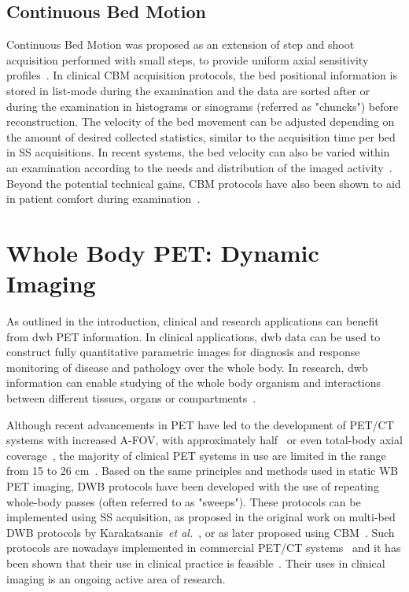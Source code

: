 \subsection{Continuous Bed Motion}
Continuous Bed Motion was proposed as an extension of step and shoot acquisition performed with small steps, to provide uniform axial sensitivity profiles~\cite{Dahlbom2001,Brasse2002}. In clinical CBM acquisition protocols, the bed positional information is stored in list-mode during the examination and the data are sorted after or during the examination in histograms or sinograms (referred as "chuncks") before reconstruction. The velocity of the bed movement can be adjusted depending on the amount of desired collected statistics, similar to the acquisition time per bed in SS acquisitions. In recent systems, the bed velocity can also be varied within an examination according to the needs and distribution of the imaged activity~\cite{Panin2014}. Beyond the potential technical gains, CBM protocols have also been shown to aid in patient comfort during examination~\cite{Schatka2016}. 
%
\section{Whole Body PET: Dynamic Imaging}
As outlined in the introduction, clinical and research applications can benefit from \gls{dwb} PET information. In clinical applications, \gls{dwb} data can be used to construct fully quantitative parametric images for diagnosis and response monitoring of disease and pathology over the whole body. In research, \gls{dwb} information can enable studying of the whole body organism and interactions between different tissues, organs or compartments~\cite{Meikle2021,Slart2021}. 

Although recent advancements in PET have led to the development of PET/CT systems with increased A-FOV, with approximately half~\cite{Karp2020,Siegel2020} or even total-body axial coverage~\cite{Cherry2018}, the majority of clinical PET systems in use are limited in the range from 15 to 26 cm~\cite{Vandenberghe2020}. 
Based on the same principles and methods used in static WB PET imaging, DWB protocols have been developed with the use of repeating whole-body passes (often referred to as "sweeps"). 
These protocols can be implemented using SS acquisition, as proposed in the original work on multi-bed DWB protocols by Karakatsanis~\textit{et al.}~\cite{Karakatsanis2011,Karakatsanis2013}, or as later proposed using CBM~\cite{Karakatsanis2016a,Hu2020}. Such protocols are nowadays implemented in commercial PET/CT systems~\cite{Hu2020} and it has been shown that their use in clinical practice is feasible~\cite{Fahrni2019,Dias2020}. Their uses in clinical imaging is an ongoing active area of research.%

